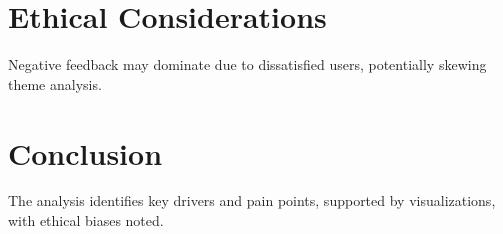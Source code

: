 \documentclass[a4paper,12pt]{article}
\begin{document}
\section{Ethical Considerations}
Negative feedback may dominate due to dissatisfied users, potentially skewing theme analysis.

\section{Conclusion}
The analysis identifies key drivers and pain points, supported by visualizations, with ethical biases noted.
\end{document}
